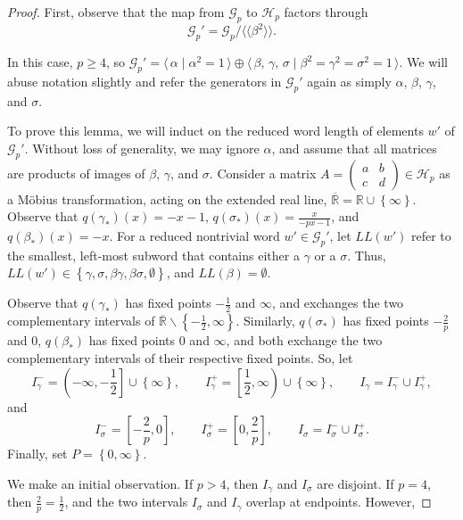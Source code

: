 \documentclass{amsart}     %
\newcommand{\rmv}{\smallsetminus}
\newcommand{\set}[1]{ \left\{ #1 \right\} }
\theoremstyle{definition}
\begin{document}
\begin{proof} First, observe that the map from $\mathcal{G}_p$ to $\mathcal{H}_p$ factors through \[\mathcal{G}_p'  = \mathcal{G}_p / \langle \langle \beta^2 \rangle \rangle. \]


In this case, $p \geq 4$, so $\mathcal{G}_p' = \langle \, \alpha \mid \alpha^2 = 1 \, \rangle \oplus \langle \, \beta, \, \gamma, \, \sigma \mid \beta^2 = \gamma^2 = \sigma^2= 1 \, \rangle$. We will abuse notation slightly and refer the generators in $\mathcal{G}_p'$ again as simply $\alpha$, $\beta$, $\gamma$, and $\sigma$.

To prove this lemma, we will induct on the reduced word length of elements $w'$ of $\mathcal{G}_p'$. Without loss of generality, we may ignore $\alpha$, and assume that all matrices are products of images of $\beta$, $\gamma$, and $\sigma$. Consider a matrix $A = \begin{pmatrix} a & b \\ c & d \end{pmatrix} \in \mathcal{H}_p$ as a M\"{o}bius transformation, acting on the extended real line, $\overline{\mathbb{R}} = \mathbb{R} \cup \set{\infty}$. Observe that $q(\gamma_*)(x) = -x - 1$, $q(\sigma_*)(x) = \frac{x}{-px - 1}$, and $q(\beta_*)(x) = -x$. For a reduced nontrivial word $w' \in \mathcal{G}_p'$, let $LL(w')$ refer to the smallest, left-most subword that contains either a $\gamma$ or a $\sigma$. Thus, $LL(w') \in \set{\gamma, \sigma, \beta \gamma, \beta \sigma, \emptyset }$, and $LL(\beta) = \emptyset$. 

Observe that $q(\gamma_*)$ has fixed points $-\frac{1}{2}$ and $\infty$, and exchanges the two complementary intervals of $\overline{\mathbb{R}} \rmv \set{-\frac{1}{2}, \infty}$. Similarly, $q(\sigma_*)$ has fixed points $-\frac{2}{p}$ and $0$,  $q(\beta_*)$ has fixed points $0$ and $\infty$, and both exchange the two complementary intervals of their respective fixed points. So, let 
\[ I_\gamma^- = \left( -\infty, -\frac{1}{2} \right] \cup \set{\infty}, \qquad I_\gamma^+ = \left[\frac{1}{2}, \infty \right) \cup \set{\infty}, \qquad I_\gamma  = I_\gamma^- \cup I_\gamma^+,  \]
%
and
%
\[ I_\sigma^- = \left[ -\frac{2}{p}, 0 \right], \qquad I_\sigma^+ = \left[ 0, \frac{2}{p} \right], \qquad I_\sigma = I_\sigma^- \cup I_\sigma^+.\]
%
Finally, set $P = \set{0, \infty}$.

We make an initial observation. If $p > 4$, then $I_\gamma$ and $I_\sigma$ are disjoint. If $p = 4$, then $\frac{2}{p} = \frac{1}{2}$, and the two intervals $I_\sigma$ and $I_\gamma$ overlap at endpoints. However,


\end{proof}
\end{document}
